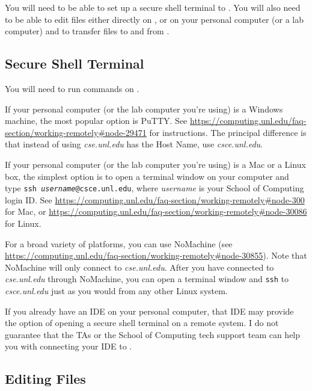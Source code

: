 
You will need to be able to set up a secure shell terminal to \runtimeenvironment.
You will also need to be able to edit files either directly on \runtimeenvironment, or on your personal computer (or a lab computer) and to transfer files to and from \runtimeenvironment.

\subsection{Secure Shell Terminal}

You will need to run commands on \runtimeenvironment.

If your personal computer (or the lab computer you're using) is a Windows machine, the most popular option is PuTTY\@.
See \url{https://computing.unl.edu/faq-section/working-remotely#node-29471} for instructions.
The principal difference is that instead of using \textit{cse.unl.edu} has the Host Name, use \textit{csce.unl.edu}.

If your personal computer (or the lab computer you're using) is a Mac or a Linux box, the simplest option is to open a terminal window on your computer and type \texttt{ssh \textit{username}@csce.unl.edu}, where \textit{username} is your School of Computing login ID\@.
See \url{https://computing.unl.edu/faq-section/working-remotely#node-300} for Mac, or \url{https://computing.unl.edu/faq-section/working-remotely#node-30086} for Linux.

For a broad variety of platforms, you can use NoMachine (see \url{https://computing.unl.edu/faq-section/working-remotely#node-30855}).
Note that NoMachine will only connect to \textit{cse.unl.edu}.
After you have connected to \textit{cse.unl.edu} through NoMachine, you can open a terminal window and \texttt{ssh} to \textit{csce.unl.edu} just as you would from any other Linux system.

If you already have an IDE on your personal computer, that IDE may provide the option of opening a secure shell terminal on a remote system.
I do not guarantee that the TAs or the School of Computing tech support team can help you with connecting your IDE to \runtimeenvironment.

\subsection{Editing Files}

